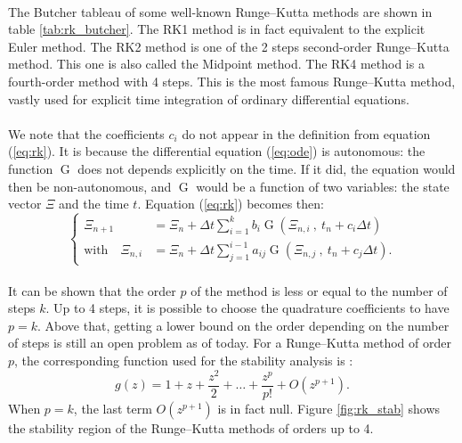         \paragraph{}
        The Butcher tableau of some well-known Runge--Kutta methods are shown in table \ref{tab:rk_butcher}.
        The RK1 method is in fact equivalent to the explicit Euler method.
        The RK2 method is one of the 2 steps second-order Runge--Kutta method.
        This one is also called the Midpoint method.
        The RK4 method is a fourth-order method with 4 steps.
        This is the most famous Runge--Kutta method, vastly used for explicit time integration of ordinary differential equations.

        \paragraph{}
        We note that the coefficients $c_i$ do not appear in the definition from equation (\ref{eq:rk}).
        It is because the differential equation (\ref{eq:ode}) is autonomous: the function $\operatorname{G}$ does not depends explicitly on the time.
        If it did, the equation would then be non-autonomous, and $\operatorname{G}$ would be a function of two variables: the state vector $\Xi$ and the time $t$.
        Equation (\ref{eq:rk}) becomes then:
        \begin{equation}
          \left\{\begin{aligned}
            \Xi_{n+1} &= \Xi_n + \Delta t \sum_{i = 1}^k b_i \operatorname{G}\left(\Xi_{n,i} \ ,\  t_n + c_i \Delta t\right) \\
            \textrm{with}\quad \Xi_{n,i} &= \Xi_n + \Delta t \sum_{j = 1}^{i-1} a_{ij} \operatorname{G}\left(\Xi_{n,j} \ ,\  t_n + c_j \Delta t\right) .
          \end{aligned}\right.
        \end{equation}

        \paragraph{}
        It can be shown that the order $p$ of the method is less or equal to the number of steps $k$.
        Up to 4 steps, it is possible to choose the quadrature coefficients to have $p = k$.
        Above that, getting a lower bound on the order depending on the number of steps is still an open problem as of today.
        For a Runge--Kutta method of order $p$, the corresponding function used for the stability analysis is \cite{HairerWanner1996}:
        \begin{equation}
          g\left(z\right) = 1 + z + \frac{z^2}{2} + \dots + \frac{z^p}{p!} + O\left(z^{p+1}\right) .
        \end{equation}
        When $p = k$, the last term $O\left(z^{p+1}\right)$ is in fact null.
        Figure \ref{fig:rk_stab} shows the stability region of the Runge--Kutta methods of orders up to 4.

